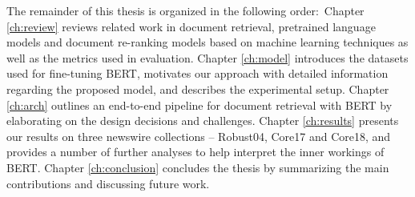 The remainder of this thesis is organized in the following order:\
Chapter \ref{ch:review} reviews related work in document retrieval, pretrained language models and document re-ranking models based on machine learning techniques as well as the metrics used in evaluation.
Chapter \ref{ch:model} introduces the datasets used for fine-tuning BERT, motivates our approach with detailed information regarding the proposed model, and describes the experimental setup.
Chapter \ref{ch:arch} outlines an end-to-end pipeline for document retrieval with BERT by elaborating on the design decisions and challenges.
Chapter \ref{ch:results} presents our results on three newswire collections -- Robust04, Core17 and Core18, and provides a number of further analyses to help interpret the inner workings of BERT.
Chapter \ref{ch:conclusion} concludes the thesis by summarizing the main contributions and discussing future work.